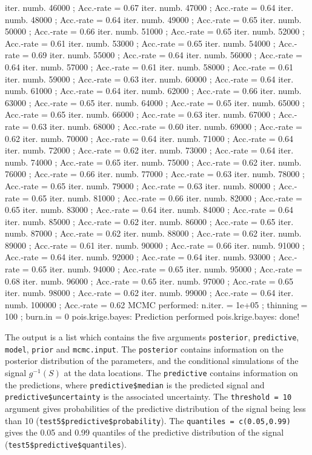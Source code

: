 \documentclass[12pt,a4paper]{article}
\newcommand{\code}[1]{\texttt{\small #1}}
\begin{document}
\begin{Schunk}
\begin{Soutput}
iter. numb. 46000 ; Acc.-rate = 0.67 
iter. numb. 47000 ; Acc.-rate = 0.64 
iter. numb. 48000 ; Acc.-rate = 0.64 
iter. numb. 49000 ; Acc.-rate = 0.65 
iter. numb. 50000 ; Acc.-rate = 0.66 
iter. numb. 51000 ; Acc.-rate = 0.65 
iter. numb. 52000 ; Acc.-rate = 0.61 
iter. numb. 53000 ; Acc.-rate = 0.65 
iter. numb. 54000 ; Acc.-rate = 0.69 
iter. numb. 55000 ; Acc.-rate = 0.64 
iter. numb. 56000 ; Acc.-rate = 0.64 
iter. numb. 57000 ; Acc.-rate = 0.61 
iter. numb. 58000 ; Acc.-rate = 0.61 
iter. numb. 59000 ; Acc.-rate = 0.63 
iter. numb. 60000 ; Acc.-rate = 0.64 
iter. numb. 61000 ; Acc.-rate = 0.64 
iter. numb. 62000 ; Acc.-rate = 0.66 
iter. numb. 63000 ; Acc.-rate = 0.65 
iter. numb. 64000 ; Acc.-rate = 0.65 
iter. numb. 65000 ; Acc.-rate = 0.65 
iter. numb. 66000 ; Acc.-rate = 0.63 
iter. numb. 67000 ; Acc.-rate = 0.63 
iter. numb. 68000 ; Acc.-rate = 0.60 
iter. numb. 69000 ; Acc.-rate = 0.62 
iter. numb. 70000 ; Acc.-rate = 0.64 
iter. numb. 71000 ; Acc.-rate = 0.64 
iter. numb. 72000 ; Acc.-rate = 0.62 
iter. numb. 73000 ; Acc.-rate = 0.64 
iter. numb. 74000 ; Acc.-rate = 0.65 
iter. numb. 75000 ; Acc.-rate = 0.62 
iter. numb. 76000 ; Acc.-rate = 0.66 
iter. numb. 77000 ; Acc.-rate = 0.63 
iter. numb. 78000 ; Acc.-rate = 0.65 
iter. numb. 79000 ; Acc.-rate = 0.63 
iter. numb. 80000 ; Acc.-rate = 0.65 
iter. numb. 81000 ; Acc.-rate = 0.66 
iter. numb. 82000 ; Acc.-rate = 0.65 
iter. numb. 83000 ; Acc.-rate = 0.64 
iter. numb. 84000 ; Acc.-rate = 0.64 
iter. numb. 85000 ; Acc.-rate = 0.62 
iter. numb. 86000 ; Acc.-rate = 0.65 
iter. numb. 87000 ; Acc.-rate = 0.62 
iter. numb. 88000 ; Acc.-rate = 0.62 
iter. numb. 89000 ; Acc.-rate = 0.61 
iter. numb. 90000 ; Acc.-rate = 0.66 
iter. numb. 91000 ; Acc.-rate = 0.64 
iter. numb. 92000 ; Acc.-rate = 0.64 
iter. numb. 93000 ; Acc.-rate = 0.65 
iter. numb. 94000 ; Acc.-rate = 0.65 
iter. numb. 95000 ; Acc.-rate = 0.68 
iter. numb. 96000 ; Acc.-rate = 0.65 
iter. numb. 97000 ; Acc.-rate = 0.65 
iter. numb. 98000 ; Acc.-rate = 0.62 
iter. numb. 99000 ; Acc.-rate = 0.64 
iter. numb. 100000 ; Acc.-rate = 0.62 
MCMC performed: n.iter. =  1e+05 ; thinning =  100 ; burn.in =  0 
pois.krige.bayes: Prediction performed 
pois.krige.bayes: done!
\end{Soutput}
\end{Schunk}

The output is a list which contains the five arguments \code{posterior}, \code{predictive}, \code{model}, \code{prior} and \code{mcmc.input}. 
The \code{posterior} contains information
on the posterior distribution of the parameters, and the conditional simulations of the signal 
$g^{-1}(S)$ at the data locations. 
The \code{predictive} contains information on the predictions, where 
\code{predictive\$median} is the predicted signal and \code{predictive\$uncertainty} is the associated uncertainty.
The \code{threshold = 10} argument gives probabilities of the predictive distribution of the signal being less 
than 10 (\code{test5\$predictive\$probability}).
The \code{quantiles = c(0.05,0.99)} gives the 0.05 and 0.99 quantiles of the predictive distribution of the signal 
(\code{test5\$predictive\$quantiles}).
\end{document}
